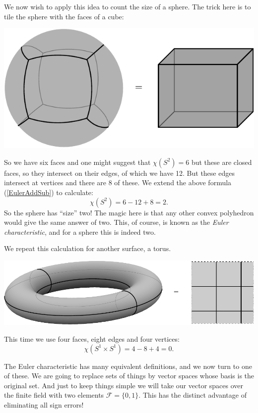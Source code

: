 \documentclass[11pt,twoside,openright]{report}
\newcommand{\Eref}[1]{(\ref{#1})}
\newcommand{\Field}{\mathcal{F}}
\def\euler{\chi}
\begin{document}
We now wish to apply this idea to count the
size of a sphere. The trick here is to tile the
sphere with the faces of a cube:
\begin{center}
\includegraphics{pic-cube.pdf}
\end{center}
So we have six faces and one might suggest that 
$\euler(S^2)=6$ but these are closed faces, so they
intersect on their edges, of which we have 12.
But these edges intersect at vertices and there are
8 of these. 
We extend the above formula \Eref{EulerAddSub} to calculate:
$$
    \euler(S^2) = 6 - 12 + 8 = 2.
$$
So the sphere has ``size'' two!
The magic here is that any other convex polyhedron would give
the same answer of two.
This, of course, is known as the \emph{Euler characteristic},
and for a sphere this is indeed two.

We repeat this calculation for another surface, a torus.
\begin{center}
\includegraphics[width=1.0\columnwidth]{pic-torus.pdf}
\end{center}
This time we use four faces, eight edges and four vertices:
$$
    \euler(S^1\times S^1) = 4 - 8 + 4 = 0.
$$

The Euler characteristic has many equivalent definitions,
and we now turn to one of these.
We are going to replace sets of things by vector
spaces whose basis is the original set.
And just to keep things simple we will 
take our vector spaces over the finite field with
two elements $\Field=\{0, 1\}.$
This has the distinct advantage
of eliminating all sign errors!
\end{document}

